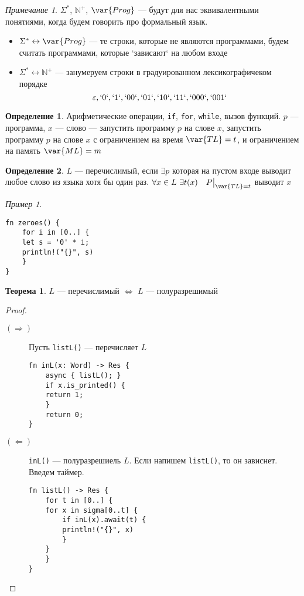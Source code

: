 \documentclass[oneside]{book}
\newcommand{\N}{\mathbb{N}}
\theoremstyle{plain}
\theoremstyle{remark}
\newtheorem*{remark}{Примечание}
\newtheorem*{examp}{Пример}
\theoremstyle{definition}
\newtheorem{theorem}{Теорема}[section]
\newtheorem*{definition}{Определение}
\begin{document}
\begin{remark}
\(\Sigma^*\), \(\N^+\), \(\var{Prog}\) --- будут для нас эквивалентными понятиями, когда будем говорить про формальный язык.
\begin{itemize}
\item \(\Sigma^* \leftrightarrow \var{Prog}\) --- те строки, которые не являются программами, будем считать программами, которые `зависают` на любом входе
\item \(\Sigma^* \leftrightarrow \N^+\) --- занумеруем строки в градуированном лексикографичеком порядке \\
\[ \varepsilon, `0`, `1`, `00`, `01`, `10`, `11`, `000`, `001` \]
\end{itemize}
\end{remark}
\begin{definition}
Арифметические операции, \texttt{if}, \texttt{for}, \texttt{while}, вызов функций. \(p\) --- программа, \(x\) --- слово --- запустить программу \(p\) на слове \(x\), запустить программу \(p\) на слове \(x\) с ограничением на время \(\var{TL} = t\), и ограничением на память \(\var{ML} = m\)
\end{definition}
\begin{definition}
\(L\) --- перечислимый, если \(\exists p\) которая на пустом входе выводит любое слово из языка хотя бы один раз. \(\forall x \in L\ \exists t(x)\quad P\big|_{\var{TL} = t}\) выводит \(x\)
\end{definition}
\begin{examp}
\-
\begin{verbatim}
fn zeroes() {
    for i in [0..] {
	let s = '0' * i;
	println!("{}", s)
    }
}
\end{verbatim}
\end{examp}
\begin{theorem}
\(L\) --- перечислимый \(\Leftrightarrow\) \(L\) --- полуразрешимый
\end{theorem}
\begin{proof}
\-
\begin{description}
\item[{\((\Rightarrow)\)}] Пусть \texttt{listL()} --- перечисляет \(L\)
\begin{verbatim}
fn inL(x: Word) -> Res {
    async { listL(); }
    if x.is_printed() {
	return 1;
    }
    return 0;
}
\end{verbatim}
\item[{\((\Leftarrow)\)}] \texttt{inL()} --- полуразрешиель \(L\). Если напишем \texttt{listL()}, то он зависнет. Введем таймер.
\begin{verbatim}
fn listL() -> Res {
    for t in [0..] {
	for x in sigma[0..t] {
	    if inL(x).await(t) {
		println!("{}", x)
	    }
	}
    }
}
\end{verbatim}
\end{description}
\end{proof}
\end{document}
